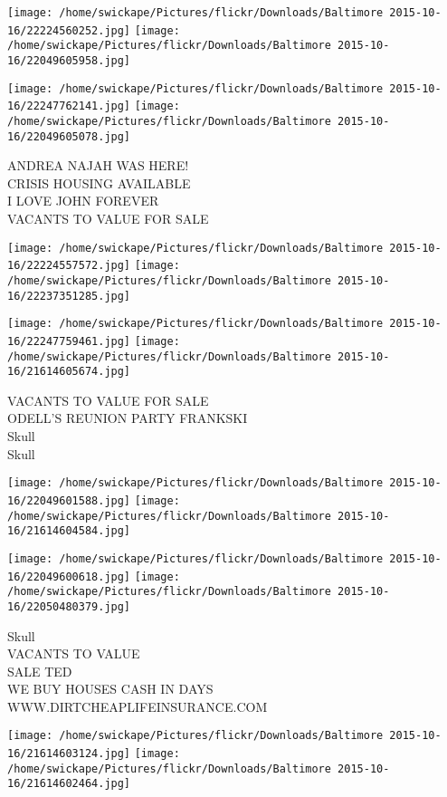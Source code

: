 \documentclass[10pt,letterpaper]{article}
\begin{document}
\texttt{[image: /home/swickape/Pictures/flickr/Downloads/Baltimore 2015-10-16/22224560252.jpg]}
\texttt{[image: /home/swickape/Pictures/flickr/Downloads/Baltimore 2015-10-16/22049605958.jpg]}

\texttt{[image: /home/swickape/Pictures/flickr/Downloads/Baltimore 2015-10-16/22247762141.jpg]}
\texttt{[image: /home/swickape/Pictures/flickr/Downloads/Baltimore 2015-10-16/22049605078.jpg]}

ANDREA NAJAH WAS HERE!\\
CRISIS HOUSING AVAILABLE\\
I LOVE JOHN FOREVER\\
VACANTS TO VALUE FOR SALE\\
\pagebreak

\texttt{[image: /home/swickape/Pictures/flickr/Downloads/Baltimore 2015-10-16/22224557572.jpg]}
\texttt{[image: /home/swickape/Pictures/flickr/Downloads/Baltimore 2015-10-16/22237351285.jpg]}

\texttt{[image: /home/swickape/Pictures/flickr/Downloads/Baltimore 2015-10-16/22247759461.jpg]}
\texttt{[image: /home/swickape/Pictures/flickr/Downloads/Baltimore 2015-10-16/21614605674.jpg]}

VACANTS TO VALUE FOR SALE\\
ODELL'S REUNION PARTY FRANKSKI\\
Skull\\
Skull\\
\pagebreak

\texttt{[image: /home/swickape/Pictures/flickr/Downloads/Baltimore 2015-10-16/22049601588.jpg]}
\texttt{[image: /home/swickape/Pictures/flickr/Downloads/Baltimore 2015-10-16/21614604584.jpg]}

\texttt{[image: /home/swickape/Pictures/flickr/Downloads/Baltimore 2015-10-16/22049600618.jpg]}
\texttt{[image: /home/swickape/Pictures/flickr/Downloads/Baltimore 2015-10-16/22050480379.jpg]}

Skull\\
VACANTS TO VALUE\\
SALE TED\\
WE BUY HOUSES CASH IN DAYS WWW.DIRTCHEAPLIFEINSURANCE.COM\\
\pagebreak

\texttt{[image: /home/swickape/Pictures/flickr/Downloads/Baltimore 2015-10-16/21614603124.jpg]}
\texttt{[image: /home/swickape/Pictures/flickr/Downloads/Baltimore 2015-10-16/21614602464.jpg]}
\end{document}
